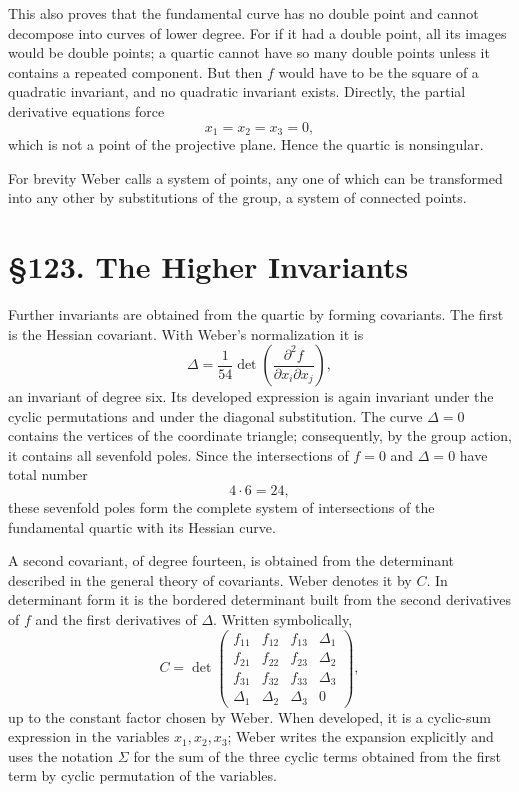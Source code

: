 \documentclass[12pt,a4paper]{article}
\newcommand{\webersection}[2]{\clearpage\section*{\S #1. #2}\addcontentsline{toc}{section}{\S #1. #2}}
\begin{document}
This also proves that the fundamental curve has no double point and cannot decompose into curves of lower degree.  For if it had a double point, all its images would be double points; a quartic cannot have so many double points unless it contains a repeated component.  But then \(f\) would have to be the square of a quadratic invariant, and no quadratic invariant exists.  Directly, the partial derivative equations force
\[
 x_1=x_2=x_3=0,
\]
which is not a point of the projective plane.  Hence the quartic is nonsingular.

For brevity Weber calls a system of points, any one of which can be transformed into any other by substitutions of the group, a system of connected points.

\webersection{123}{The Higher Invariants}

Further invariants are obtained from the quartic by forming covariants.  The first is the Hessian covariant.  With Weber's normalization it is
\[
 \Delta=\frac1{54}
 \det\left(\frac{\partial^2 f}{\partial x_i\partial x_j}\right),
\]
an invariant of degree six.  Its developed expression is again invariant under the cyclic permutations and under the diagonal substitution.  The curve \(\Delta=0\) contains the vertices of the coordinate triangle; consequently, by the group action, it contains all sevenfold poles.  Since the intersections of \(f=0\) and \(\Delta=0\) have total number
\[
 4\cdot6=24,
\]
these sevenfold poles form the complete system of intersections of the fundamental quartic with its Hessian curve.

A second covariant, of degree fourteen, is obtained from the determinant described in the general theory of covariants.  Weber denotes it by \(C\).  In determinant form it is the bordered determinant built from the second derivatives of \(f\) and the first derivatives of \(\Delta\).  Written symbolically,
\[
 C=\det
 \begin{pmatrix}
 f_{11}&f_{12}&f_{13}&\Delta_1\\
 f_{21}&f_{22}&f_{23}&\Delta_2\\
 f_{31}&f_{32}&f_{33}&\Delta_3\\
 \Delta_1&\Delta_2&\Delta_3&0
 \end{pmatrix},
\]
up to the constant factor chosen by Weber.  When developed, it is a cyclic-sum expression in the variables \(x_1,x_2,x_3\); Weber writes the expansion explicitly and uses the notation \(\Sigma\) for the sum of the three cyclic terms obtained from the first term by cyclic permutation of the variables.
\end{document}
